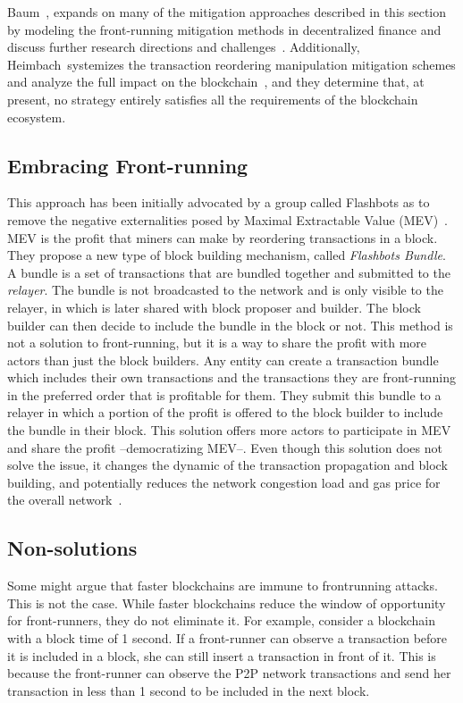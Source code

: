 Baum~\etal, expands on many of the mitigation approaches described in this section by modeling the front-running mitigation methods in decentralized finance and discuss further research directions and challenges~\cite{baum2022sok}. Additionally, Heimbach~\etal systemizes the transaction reordering manipulation mitigation schemes and analyze the full impact on the blockchain~\cite{heimbach2022sok}, and they determine that, at present, no strategy entirely satisfies all the requirements of the blockchain ecosystem.


\subsection{Embracing Front-running}\label{MEVfrontrunning} 
This approach has been initially advocated by a group called Flashbots as to remove the negative externalities posed by Maximal Extractable Value (MEV)~\cite{flashbotswebsite}. MEV is the profit that miners can make by reordering transactions in a block. They propose a new type of block building mechanism, called \textit{Flashbots Bundle}. A bundle is a set of transactions that are bundled together and submitted to the \textit{relayer}. The bundle is not broadcasted to the network and is only visible to the relayer, in which is later shared with block proposer and builder. The block builder can then decide to include the bundle in the block or not. This method is not a solution to front-running, but it is a way to share the profit with more actors than just the block builders. Any entity can create a transaction bundle which includes their own transactions and the transactions they are front-running in the preferred order that is profitable for them. They submit this bundle to a relayer in which a portion of the profit is offered to the block builder to include the bundle in their block. This solution offers more actors to participate in MEV and share the profit --democratizing MEV--. Even though this solution does not solve the issue, it changes the dynamic of the transaction propagation and block building, and potentially reduces the network congestion load and gas price for the overall network~\cite{cryptofrens2023}. 


\subsection{Non-solutions}
Some might argue that faster blockchains are immune to frontrunning attacks. This is not the case. While faster blockchains reduce the window of opportunity for front-runners, they do not eliminate it. For example, consider a blockchain with a block time of 1 second. If a front-runner can observe a transaction before it is included in a block, she can still insert a transaction in front of it. This is because the front-runner can observe the P2P network transactions and send her transaction in less than 1 second to be included in the next block. 


